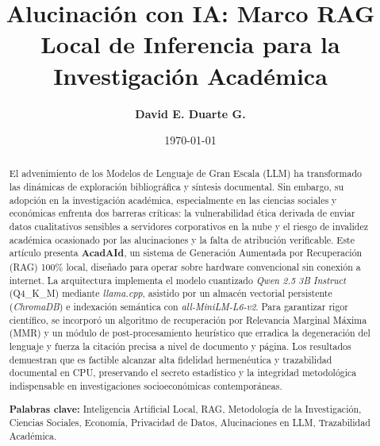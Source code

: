 \documentclass[12pt,a4paper]{article}
\title{\textbf{Alucinación con IA: Marco RAG Local de Inferencia para la Investigación Académica}}
\author[1]{\textbf{David E. Duarte G.}}
\affil[1,2]{Dirección de Informática, Universidad de Carabobo}
\date{\today}
\begin{document}
\maketitle

\begin{abstract}
\noindent El advenimiento de los Modelos de Lenguaje de Gran Escala (LLM) ha transformado las dinámicas de exploración bibliográfica y síntesis documental. Sin embargo, su adopción en la investigación académica, especialmente en las ciencias sociales y económicas enfrenta dos barreras críticas: la vulnerabilidad ética derivada de enviar datos cualitativos sensibles a servidores corporativos en la nube y el riesgo de invalidez académica ocasionado por las alucinaciones y la falta de atribución verificable. Este artículo presenta \textbf{AcadAId}, un sistema de Generación Aumentada por Recuperación (RAG) 100\% local, diseñado para operar sobre hardware convencional sin conexión a internet. La arquitectura implementa el modelo cuantizado \textit{Qwen 2.5 3B Instruct} (Q4\_K\_M) mediante \textit{llama.cpp}, asistido por un almacén vectorial persistente (\textit{ChromaDB}) e indexación semántica con \textit{all-MiniLM-L6-v2}. Para garantizar rigor científico, se incorporó un algoritmo de recuperación por Relevancia Marginal Máxima (MMR) y un módulo de post-procesamiento heurístico que erradica la degeneración del lenguaje y fuerza la citación precisa a nivel de documento y página. Los resultados demuestran que es factible alcanzar alta fidelidad hermenéutica y trazabilidad documental en CPU, preservando el secreto estadístico y la integridad metodológica indispensable en investigaciones socioeconómicas contemporáneas.
\vspace{0.25cm}

\noindent \textbf{Palabras clave:} Inteligencia Artificial Local, RAG, Metodología de la Investigación, Ciencias Sociales, Economía, Privacidad de Datos, Alucinaciones en LLM, Trazabilidad Académica.
\end{abstract}

\vspace{0.6cm}

\newpage
\end{document}
